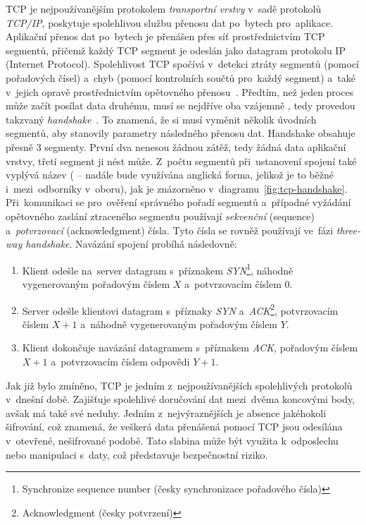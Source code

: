 TCP je nejpoužívanějším protokolem \textit{transportní vrstvy} v~sadě protokolů \textit{TCP/IP}, poskytuje spolehlivou službu přenosu dat po~bytech pro~aplikace. Aplikační přenos dat po~bytech je přenášen přes síť prostřednictvím TCP segmentů, přičemž každý TCP segment je odeslán jako datagram protokolu IP (Internet Protocol). Spolehlivost TCP spočívá v~detekci ztráty segmentů (pomocí pořadových čísel) a~chyb (pomocí kontrolních součtů pro~každý segment) a~také v~jejich opravě prostřednictvím opětovného přenosu~\cite{rfc-tcp}. Předtím, než jeden proces může začít posílat data druhému, musí se nejdříve oba vzájemně , tedy provedou takzvaný \textit{handshake}~\cite{kurose2021}. To znamená, že si musí vyměnit několik úvodních segmentů, aby stanovily parametry následného přenosu dat. Handshake obsahuje přesně 3 segmenty. První dva nenesou žádnou zátěž, tedy žádná data aplikační vrstvy, třetí segment ji nést může. Z~počtu segmentů při~ustanovení spojení také vyplývá název  ( – nadále bude využívána anglická forma, jelikož je to běžné i~mezi~odborníky v~oboru), jak je znázorněno v~diagramu~\ref{fig:tcp-handshake}. Při~komunikaci se pro~ověření správného pořadí segmentů a~případné vyžádání opětovného zaslání ztraceného segmentu používají \textit{sekvenční} (sequence) a~\textit{potvrzovací} (acknowledgment) čísla. Tyto čísla se rovněž používají ve~fázi \textit{three-way handshake}.
\newpage
Navázání spojení probíhá následovně:
\begin{enumerate}
	\item Klient odešle na~server datagram s~příznakem \textit{SYN}\footnote{Synchronize sequence number (česky synchronizace pořadového čísla)}, náhodně vygenerovaným pořadovým číslem $X$ a~potvrzovacím číslem 0.
	\item Server odešle klientovi datagram s~příznaky \textit{SYN} a~\textit{ACK}\footnote{Acknowledgment (česky potvrzení)}, potvrzovacím číslem $X+1$ a~náhodně vygenerovaným pořadovým číslem $Y$. 
	\item Klient dokončuje navázání datagramem s~příznakem \textit{ACK}, pořadovým číslem $X+1$ a~potvrzovacím číslem odpovědi $Y+1$.
\end{enumerate}
Jak již bylo zmíněno, TCP je jedním z~nejpoužívanějších spolehlivých protokolů v~dnešní době. Zajišťuje spolehlivé doručování dat mezi~dvěma koncovými body, avšak má také své neduhy. Jedním z~nejvýraznějších je absence jakéhokoli šifrování, což znamená, že veškerá data přenášená pomocí TCP jsou odesílána v~otevřené, nešifrované podobě. Tato slabina může být využita k~odposlechu nebo manipulaci s~daty, což představuje bezpečnostní riziko. 

